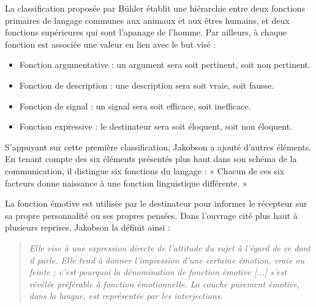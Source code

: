 La classification proposée par Bühler établit une hiérarchie entre deux fonctions primaires de langage communes aux animaux et aux êtres humains, et deux fonctions supérieures qui sont l’apanage de l’homme. Par ailleurs, à chaque fonction est associée une valeur en lien avec le but visé :
\begin{itemize}
\item Fonction argumentative : un argument sera soit pertinent, soit non pertinent.
\item Fonction de description : une description sera soit vraie, soit fausse.
\item Fonction de signal : un signal sera soit efficace, soit inefficace.
\item Fonction expressive : le destinateur sera soit éloquent, soit non éloquent.
\end{itemize}

S’appuyant sur cette première classification, Jakobson a ajouté d’autres éléments. En tenant compte des six éléments présentés plus haut dans son schéma de la communication, il distingue six fonctions du langage : « Chacun de ces six facteurs donne naissance à une fonction linguistique différente. »

La fonction émotive est utilisée par le destinateur pour informer le récepteur sur sa propre personnalité ou ses propres pensées. Dans l’ouvrage cité plus haut à plusieurs reprises, Jakobson la définit ainsi :
\begin{quote}\small\itshape
Elle vise à une expression directe de l’attitude du sujet à l’égard de ce dont il parle. Elle tend à donner l’impression d’une certaine émotion, vraie ou feinte ; c’est pourquoi la dénomination de fonction émotive [...] s’est révélée préférable à fonction émotionnelle. La couche purement émotive, dans la langue, est représentée par les interjections.
\end{quote}

